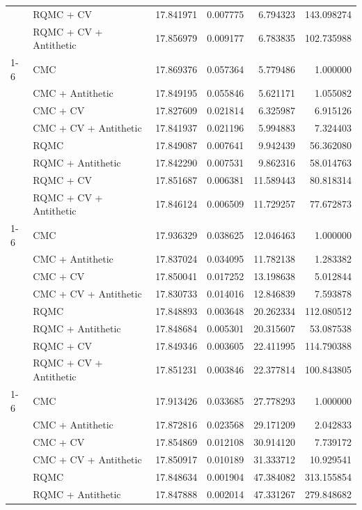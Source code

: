 \begin{tabular}{llrrrr}
 & RQMC + CV & 17.841971 & 0.007775 & 6.794323 & 143.098274 \\
 & RQMC + CV + Antithetic & 17.856979 & 0.009177 & 6.783835 & 102.735988 \\
\cline{1-6}
\multirow[t]{8}{*}{16384} & CMC & 17.869376 & 0.057364 & 5.779486 & 1.000000 \\
 & CMC + Antithetic & 17.849195 & 0.055846 & 5.621171 & 1.055082 \\
 & CMC + CV & 17.827609 & 0.021814 & 6.325987 & 6.915126 \\
 & CMC + CV + Antithetic & 17.841937 & 0.021196 & 5.994883 & 7.324403 \\
 & RQMC & 17.849087 & 0.007641 & 9.942439 & 56.362080 \\
 & RQMC + Antithetic & 17.842290 & 0.007531 & 9.862316 & 58.014763 \\
 & RQMC + CV & 17.851687 & 0.006381 & 11.589443 & 80.818314 \\
 & RQMC + CV + Antithetic & 17.846124 & 0.006509 & 11.729257 & 77.672873 \\
\cline{1-6}
\multirow[t]{8}{*}{32768} & CMC & 17.936329 & 0.038625 & 12.046463 & 1.000000 \\
 & CMC + Antithetic & 17.837024 & 0.034095 & 11.782138 & 1.283382 \\
 & CMC + CV & 17.850041 & 0.017252 & 13.198638 & 5.012844 \\
 & CMC + CV + Antithetic & 17.830733 & 0.014016 & 12.846839 & 7.593878 \\
 & RQMC & 17.848893 & 0.003648 & 20.262334 & 112.080512 \\
 & RQMC + Antithetic & 17.848684 & 0.005301 & 20.315607 & 53.087538 \\
 & RQMC + CV & 17.849346 & 0.003605 & 22.411995 & 114.790388 \\
 & RQMC + CV + Antithetic & 17.851231 & 0.003846 & 22.377814 & 100.843805 \\
\cline{1-6}
\multirow[t]{8}{*}{65536} & CMC & 17.913426 & 0.033685 & 27.778293 & 1.000000 \\
 & CMC + Antithetic & 17.872816 & 0.023568 & 29.171209 & 2.042833 \\
 & CMC + CV & 17.854869 & 0.012108 & 30.914120 & 7.739172 \\
 & CMC + CV + Antithetic & 17.850917 & 0.010189 & 31.333712 & 10.929541 \\
 & RQMC & 17.848634 & 0.001904 & 47.384082 & 313.155854 \\
 & RQMC + Antithetic & 17.847888 & 0.002014 & 47.331267 & 279.848682 \\

\end{tabular}
